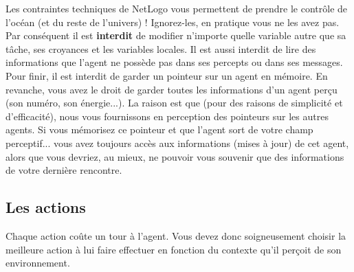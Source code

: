 \documentclass[a4paper,11pt]{article}
\begin{document}
Les contraintes techniques de NetLogo vous permettent de prendre le contrôle de l'océan (et du reste
de l'univers) ! Ignorez-les, en pratique vous ne les avez pas. Par conséquent il est
\textbf{interdit} de modifier n'importe quelle variable autre que sa tâche, ses croyances et les
variables locales. Il est aussi interdit de lire des informations que l'agent ne possède pas dans
ses percepts ou dans ses messages.\\

Pour finir, il est interdit de garder un pointeur sur un agent en mémoire. En revanche, vous avez le
droit de garder toutes les informations d'un agent perçu (son numéro, son énergie...). La raison est
que (pour des raisons de simplicité et d'efficacité), nous vous fournissons en perception des
pointeurs sur les autres agents. Si vous mémorisez ce pointeur et que l'agent sort de votre champ
perceptif... vous avez toujours accès aux informations (mises à jour) de cet agent, alors que vous
devriez, au mieux, ne pouvoir vous souvenir que des informations de votre dernière rencontre.

\subsection*{Les actions}

Chaque action coûte un tour à l'agent. Vous devez donc soigneusement choisir la meilleure action à lui
faire effectuer en fonction du contexte qu'il perçoit de son environnement.
\end{document}
